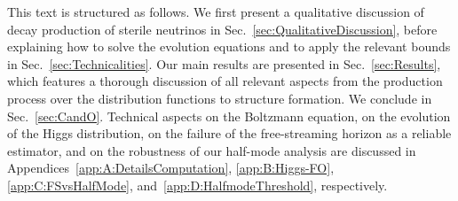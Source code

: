 This text is structured as follows. We first present a qualitative discussion of decay production of sterile neutrinos in Sec.~\ref{sec:QualitativeDiscussion}, before explaining how to solve the evolution equations and to apply the relevant bounds in Sec.~\ref{sec:Technicalities}. Our main results are presented in Sec.~\ref{sec:Results}, which features a thorough discussion of all relevant aspects from the production process over the distribution functions to structure formation. We conclude in Sec.~\ref{sec:CandO}. Technical aspects on the Boltzmann equation, on the evolution of the Higgs distribution, on the failure of the free-streaming horizon as a reliable estimator, and on the robustness of our half-mode analysis are discussed in Appendices~\ref{app:A:DetailsComputation}, \ref{app:B:Higgs-FO}, \ref{app:C:FSvsHalfMode}, and~\ref{app:D:HalfmodeThreshold}, respectively.


